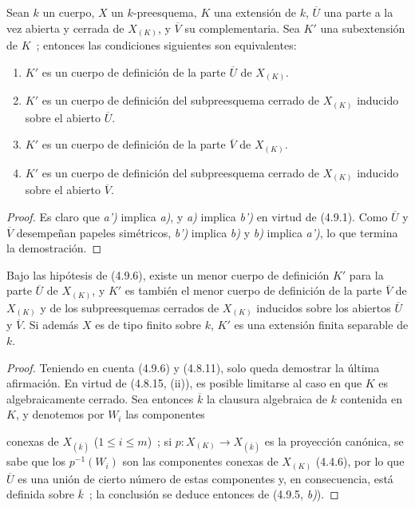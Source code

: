 \begin{proposition}[4.9.6]
\label{IV.2.4.9.6-fr}
Sean $k$ un cuerpo, $X$ un $k$-preesquema, $K$ una extensión de $k$,
$\overline U$ una parte a la vez abierta y cerrada de $X_{(K)}$, y
$\overline V$ su complementaria. Sea $K'$ una subextensión de $K$~; entonces
las condiciones siguientes son equivalentes:
\begin{enumerate}
\item[\textup{a)}] $K'$ es un cuerpo de definición de la parte $\overline U$ de
$X_{(K)}$.
\item[\textup{a')}] $K'$ es un cuerpo de definición del subpreesquema cerrado de
$X_{(K)}$ inducido sobre el abierto $\overline U$.
\item[\textup{b)}] $K'$ es un cuerpo de definición de la parte $\overline V$ de
$X_{(K)}$.
\item[\textup{b')}] $K'$ es un cuerpo de definición del subpreesquema cerrado de
$X_{(K)}$ inducido sobre el abierto $\overline V$.
\end{enumerate}
\end{proposition}

\begin{proof}
Es claro que \emph{a')} implica \emph{a)}, y \emph{a)} implica \emph{b')} en virtud de (4.9.1). Como
$\overline U$ y $\overline V$ desempeñan papeles simétricos, \emph{b')} implica \emph{b)} y
\emph{b)} implica \emph{a')}, lo que termina la demostración.
\end{proof}

\begin{corollary}[4.9.7]
\label{IV.2.4.9.7-fr}
Bajo las hipótesis de \textup{(4.9.6)}, existe un menor cuerpo de definición $K'$ para
la parte $\overline U$ de $X_{(K)}$, y $K'$ es también el menor cuerpo de
definición de la parte $\overline V$ de $X_{(K)}$ y de los
subpreesquemas cerrados de $X_{(K)}$ inducidos sobre los abiertos $\overline U$
y $\overline V$. Si además $X$ es de tipo finito sobre $k$, $K'$ es una
extensión finita separable de $k$.
\end{corollary}

\begin{proof}
Teniendo en cuenta (4.9.6) y (4.8.11), solo queda demostrar la última
afirmación. En virtud de (4.8.15, (ii)), es posible limitarse al caso en que $K$
es algebraicamente cerrado. Sea entonces $\overline k$ la clausura algebraica
de $k$ contenida en $K$, y denotemos por $W_i$ las componentes


conexas de $X_{(\overline k)}$ ($1\leq i\leq m$)~; si
$p:X_{(K)}\to X_{(\overline k)}$ es la proyección canónica, se sabe que los
$p^{-1}(W_i)$ son las componentes conexas de $X_{(K)}$ (4.4.6), por lo que
$\overline U$ es una unión de cierto número de estas componentes y, en
consecuencia, está definida sobre $\overline k$~; la conclusión se deduce
entonces de (4.9.5, \emph{b)}).
\end{proof}
